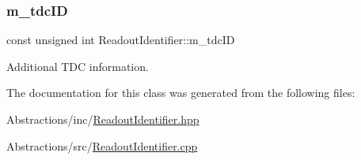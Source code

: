 \subsubsection{\texorpdfstring{m\+\_\+tdc\+ID}{m\_tdcID}}
{\footnotesize\ttfamily const unsigned int Readout\+Identifier\+::m\+\_\+tdc\+ID\hspace{0.3cm}{\ttfamily [private]}}



Additional T\+DC information. 



The documentation for this class was generated from the following files\+:\begin{DoxyCompactItemize}
\item 
Abstractions/inc/\hyperlink{_readout_identifier_8hpp}{Readout\+Identifier.\+hpp}\item 
Abstractions/src/\hyperlink{_readout_identifier_8cpp}{Readout\+Identifier.\+cpp}\end{DoxyCompactItemize}
